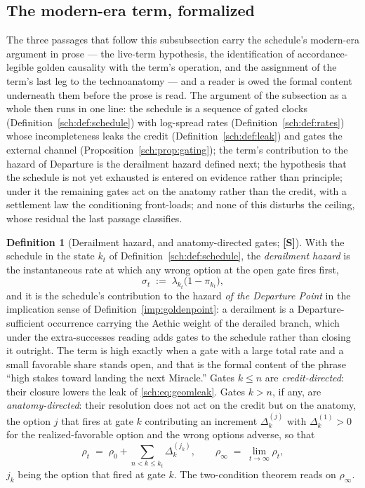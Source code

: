 \documentclass[11pt]{article}
\theoremstyle{plain}
\theoremstyle{definition}
\newtheorem{definition}[theorem]{Definition}
\theoremstyle{remark}
\begin{document}
\subsection{The modern-era term, formalized}\label{sch:subsub:modernterm}

The three passages that follow this subsubsection carry the
schedule's modern-era argument in prose --- the live-term
hypothesis, the identification of accordance-legible golden
causality with the term's operation, and the assignment of the
term's last leg to the technoanatomy --- and a reader is owed the
formal content underneath them before the prose is read. The
argument of the subsection as a whole then runs in one line: the
schedule is a sequence of gated clocks (Definition~\ref{sch:def:schedule})
with log-spread rates (Definition~\ref{sch:def:rates}) whose
incompleteness leaks the credit (Definition~\ref{sch:def:leak}) and
gates the external channel (Proposition~\ref{sch:prop:gating}); the
term's contribution to the hazard of Departure is the derailment
hazard defined next; the hypothesis that the schedule is not yet
exhausted is entered on evidence rather than principle; under it the
remaining gates act on the anatomy rather than the credit, with a
settlement law the conditioning front-loads; and none of this
disturbs the ceiling, whose residual the last passage classifies.

\begin{definition}[Derailment hazard, and anatomy-directed gates;
\textbf{[S]}]\label{sch:def:derailment}
With the schedule in the state $k_t$ of Definition~\ref{sch:def:schedule},
the \emph{derailment hazard} is the instantaneous rate at which any
wrong option at the open gate fires first,
\begin{equation}\label{sch:eq:derailment}
\sigma_t\;:=\;\lambda_{k_t}\bigl(1-\pi_{k_t}\bigr),
\end{equation}
and it is the schedule's contribution to the hazard \emph{of the
Departure Point} in the implication sense of
Definition~\ref{imp:goldenpoint}: a derailment is a Departure-sufficient
occurrence carrying the Aethic weight of the derailed branch, which
under the extra-successes reading adds gates to the schedule rather
than closing it outright. The term is high exactly when a gate with a
large total rate and a small favorable share stands open, and that is
the formal content of the phrase ``high stakes toward landing the next
Miracle.'' Gates $k\le n$ are \emph{credit-directed}: their closure
lowers the leak of \eqref{sch:eq:geomleak}. Gates $k>n$, if any, are
\emph{anatomy-directed}: their resolution does not act on the credit
but on the anatomy, the option $j$ that fires at gate $k$ contributing
an increment $\Delta_{k}^{(j)}$ with $\Delta_{k}^{(1)}>0$ for the
realized-favorable option and the wrong options adverse, so that
\begin{equation}\label{sch:eq:rhoprocess}
\rho_t\;=\;\rho_0+\sum_{n<k\le k_t}\Delta_{k}^{(j_k)},
\qquad
\rho_\infty\;=\;\lim_{t\to\infty}\rho_t,
\end{equation}
$j_k$ being the option that fired at gate $k$. The two-condition
theorem reads on $\rho_\infty$.
\end{definition}
\end{document}
